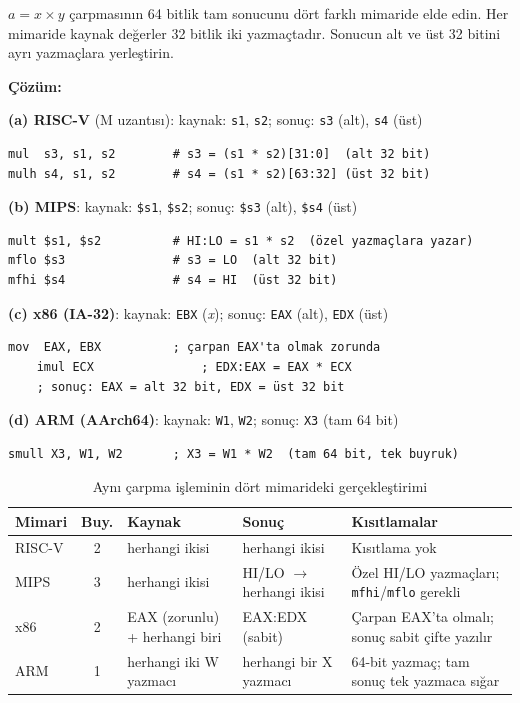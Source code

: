 \begin{ornek}[3.11]
\label{orn:carpma-64bit}
$a = x \times y$ çarpmasının 64 bitlik tam sonucunu dört farklı mimaride elde edin. Her mimaride kaynak değerler 32 bitlik iki yazmaçtadır. Sonucun alt ve üst 32 bitini ayrı yazmaçlara yerleştirin.

\textbf{Çözüm:}

\textbf{(a) RISC-V} (M uzantısı): kaynak: \texttt{s1}, \texttt{s2}; sonuç: \texttt{s3} (alt), \texttt{s4} (üst)
\begin{lstlisting}[style=riscv]
mul  s3, s1, s2        # s3 = (s1 * s2)[31:0]  (alt 32 bit)
mulh s4, s1, s2        # s4 = (s1 * s2)[63:32] (üst 32 bit)
\end{lstlisting}

\textbf{(b) MIPS}: kaynak: \texttt{\$s1}, \texttt{\$s2}; sonuç: \texttt{\$s3} (alt), \texttt{\$s4} (üst)
\begin{lstlisting}[style=mips]
mult $s1, $s2          # HI:LO = s1 * s2  (özel yazmaçlara yazar)
mflo $s3               # s3 = LO  (alt 32 bit)
mfhi $s4               # s4 = HI  (üst 32 bit)
\end{lstlisting}

\textbf{(c) x86 (IA-32)}: kaynak: \texttt{EBX} (\emph{x}); sonuç: \texttt{EAX} (alt), \texttt{EDX} (üst)
\begin{lstlisting}[language={}, morecomment={[l]{;}}, texcl=true]
    mov  EAX, EBX          ; çarpan EAX'ta olmak zorunda
    imul ECX               ; EDX:EAX = EAX * ECX
    ; sonuç: EAX = alt 32 bit, EDX = üst 32 bit
\end{lstlisting}

\textbf{(d) ARM (AArch64)}: kaynak: \texttt{W1}, \texttt{W2}; sonuç: \texttt{X3} (tam 64 bit)
\begin{lstlisting}[language={}, morecomment={[l]{;}}, texcl=true]
    smull X3, W1, W2       ; X3 = W1 * W2  (tam 64 bit, tek buyruk)
\end{lstlisting}

\medskip
\begin{table}[H]
\centering
\caption{Aynı çarpma işleminin dört mimarideki gerçekleştirimi}
\label{tab:carpma-karsilastirma-kod}
\footnotesize
\begin{tabular}{lcp{2.5cm}p{2.5cm}p{4cm}}
\toprule
\textbf{Mimari} & \textbf{Buy.} & \textbf{Kaynak} & \textbf{Sonuç} & \textbf{Kısıtlamalar} \\
\midrule
RISC-V  & 2 & herhangi ikisi & herhangi ikisi & Kısıtlama yok \\[2pt]
MIPS    & 3 & herhangi ikisi & HI/LO $\to$ herhangi ikisi & Özel HI/LO yazmaçları; \texttt{mfhi}/\texttt{mflo} gerekli \\[2pt]
x86     & 2 & EAX (zorunlu) + herhangi biri & EAX:EDX (sabit) & Çarpan EAX'ta olmalı; sonuç sabit çifte yazılır \\[2pt]
ARM     & 1 & herhangi iki W yazmacı & herhangi bir X yazmacı & 64-bit yazmaç; tam sonuç tek yazmaca sığar \\
\bottomrule
\end{tabular}
\end{table}


\end{ornek}
